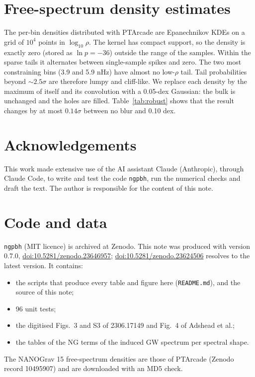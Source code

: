 \documentclass[11pt,a4paper]{article}
\begin{document}
\section{Free-spectrum density estimates}\label{app:kde}

The per-bin densities distributed with PTArcade \cite{PTArcade,Lamb} are Epanechnikov KDEs on a
grid of $10^4$ points in $\log_{10}\rho$. The kernel has compact support, so the density is
exactly zero (stored as $\ln p=-36$) outside the range of the samples. Within the sparse tails it
alternates between single-sample spikes and zero. The two most constraining bins (3.9 and
5.9 nHz) have almost no low-$\rho$ tail. Tail probabilities beyond $\sim2.5\sigma$ are therefore
lumpy and cliff-like. We replace each density by the maximum of itself and its convolution with a
0.05-dex Gaussian: the bulk is unchanged and the holes are filled. Table~\ref{tab:robust} shows
that the result changes by at most $0.14\sigma$ between no blur and 0.10 dex.

\section*{Acknowledgements}
This work made extensive use of the AI assistant Claude (Anthropic), through Claude Code, to write
and test the code \texttt{ngpbh}, run the numerical checks and draft the text. The author is
responsible for the content of this note.

\section*{Code and data}
\texttt{ngpbh} (MIT licence) is archived at Zenodo. This note was produced with version 0.7.0,
\href{https://doi.org/10.5281/zenodo.23646957}{doi:10.5281/zenodo.23646957};
\href{https://doi.org/10.5281/zenodo.23624506}{doi:10.5281/zenodo.23624506} resolves to the latest
version. It contains:
\begin{itemize}
\item the scripts that produce every table and figure here (\texttt{README.md}), and the source of
this note;
\item 96 unit tests;
\item the digitised Figs.~3 and S3 of 2306.17149 and Fig.~4 of Adshead et al.;
\item the tables of the NG terms of the induced GW spectrum per spectral shape.
\end{itemize}
The NANOGrav 15 free-spectrum densities are those of PTArcade (Zenodo record 10495907) and are
downloaded with an MD5 check.
\end{document}
